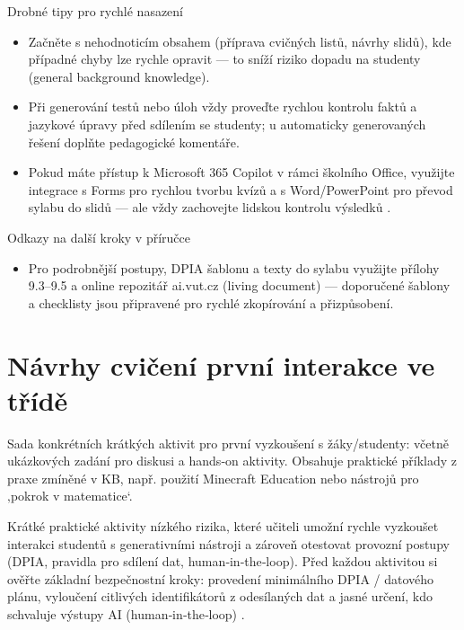 \documentclass{report}%
\begin{document}
Drobné tipy pro rychlé nasazení
\begin{itemize}
  \item Začněte s nehodnoticím obsahem (příprava cvičných listů, návrhy slidů), kde případné chyby lze rychle opravit — to sníží riziko dopadu na studenty (general background knowledge).
  \item Při generování testů nebo úloh vždy proveďte rychlou kontrolu faktů a jazykové úpravy před sdílením se studenty; u automaticky generovaných řešení doplňte pedagogické komentáře.
  \item Pokud máte přístup k Microsoft 365 Copilot v rámci školního Office, využijte integrace s Forms pro rychlou tvorbu kvízů a s Word/PowerPoint pro převod sylabu do slidů — ale vždy zachovejte lidskou kontrolu výsledků \cite{kb_ai_101_tipu_pdf_04e4a115_page_3_1, kb_ai_101_tipu_pdf_04e4a115_page_36_1}.
\end{itemize}

Odkazy na další kroky v příručce
\begin{itemize}
  \item Pro podrobnější postupy, DPIA šablonu a texty do sylabu využijte přílohy 9.3–9.5 a online repozitář ai.vut.cz (living document) — doporučené šablony a checklisty jsou připravené pro rychlé zkopírování a přizpůsobení.
\end{itemize}%

%
\section{Návrhy cvičení první interakce ve třídě}%
Sada konkrétních krátkých aktivit pro první vyzkoušení s žáky/studenty: včetně ukázkových zadání pro diskusi a hands‑on aktivity. Obsahuje praktické příklady z praxe zmíněné v KB, např. použití Minecraft Education nebo nástrojů pro ‚pokrok v matematice‘.%


%
Krátké praktické aktivity nízkého rizika, které učiteli umožní rychle vyzkoušet interakci studentů s generativními nástroji a zároveň otestovat provozní postupy (DPIA, pravidla pro sdílení dat, human‑in‑the‑loop). Před každou aktivitou si ověřte základní bezpečnostní kroky: provedení minimálního DPIA / datového plánu, vyloučení citlivých identifikátorů z odesílaných dat a jasné určení, kdo schvaluje výstupy AI (human‑in‑the‑loop) \cite{kb_malinka_chatgpt_ve_vyuce_dva_roky_pote_2024_pdf_90bc3aaf_page_12_1}. 
\end{document}
